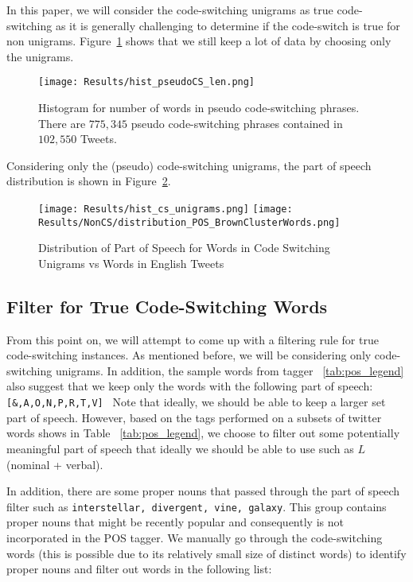 \documentclass[conference]{IEEEtran}
\begin{document}
In this paper, we will consider the code-switching unigrams as true code-switching as it is generally challenging to determine if the code-switch is true for non unigrams. Figure~\ref{fig:hist_cs_len} shows that we still keep a lot of data by choosing only the unigrams.

\begin{figure}[H]
	\centering
	\texttt{[image: Results/hist\_pseudoCS\_len.png]}
	\caption{Histogram for number of words in pseudo code-switching phrases. There are $775,345$  pseudo code-switching phrases  contained in  $102,550$ Tweets.}
	\label{fig:hist_cs_len}
\end{figure}

Considering only the (pseudo) code-switching unigrams,  the part of speech distribution is shown in Figure~\ref{fig:pos_uni}.



\begin{figure}[H]
	\centering
	\texttt{[image: Results/hist\_cs\_unigrams.png]}
	\texttt{[image: Results/NonCS/distribution\_POS\_BrownClusterWords.png]}
	\caption{Distribution of Part of Speech for Words in Code Switching Unigrams vs Words in English Tweets}
	\label{fig:pos_uni}
\end{figure}




\subsection{Filter for True Code-Switching Words}
From this point on, we will attempt to come up with a filtering rule for true code-switching instances. As mentioned before, we will be considering only code-switching unigrams. 
In addition, the sample words from tagger ~\ref{tab:pos_legend} also suggest that we keep  only the words with the following part of speech:  \verb| [&,A,O,N,P,R,T,V] | Note that ideally, we should be able to keep a larger set part of speech. However, based on the tags performed on a subsets of twitter words shows in Table ~\ref{tab:pos_legend}, we choose to filter out some potentially meaningful part of speech that ideally we should be able to use such as $L$ (nominal + verbal). 


In addition, there are some proper nouns that passed through the part of speech filter such as {\tt interstellar, divergent, vine, galaxy}. This group contains proper nouns that might be recently popular and consequently is not incorporated in the POS tagger. We manually go through the code-switching words (this is possible due to its relatively small size of distinct words) to identify proper nouns and filter out words in the following list:
\end{document}
